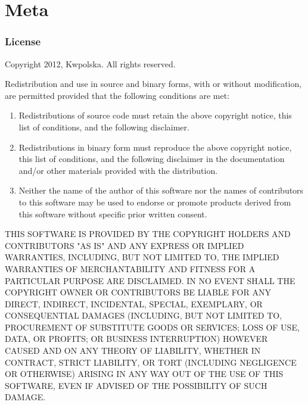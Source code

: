 \documentclass[a4paper,english]{paper}
\providecommand{\\}{\\}
\begin{document}


\part{Meta}
\label{chap:Meta}
\setcounter{section}{0}
\section{License}
Copyright \textcopyright{} 2012, Kwpolska.
All rights reserved.

Redistribution and use in source and binary forms, with or without
modification, are permitted provided that the following conditions are
met:

\begin{enumerate}
    \item Redistributions of source code must retain the above copyright
        notice, this list of conditions, and the following disclaimer.

    \item Redistributions in binary form must reproduce the above copyright
        notice, this list of conditions, and the following disclaimer in the
        documentation and/or other materials provided with the distribution.

    \item Neither the name of the author of this software nor the names of
        contributors to this software may be used to endorse or promote
        products derived from this software without specific prior written
        consent.
\end{enumerate}

THIS SOFTWARE IS PROVIDED BY THE COPYRIGHT HOLDERS AND CONTRIBUTORS
"AS IS" AND ANY EXPRESS OR IMPLIED WARRANTIES, INCLUDING, BUT NOT
LIMITED TO, THE IMPLIED WARRANTIES OF MERCHANTABILITY AND FITNESS FOR
A PARTICULAR PURPOSE ARE DISCLAIMED.  IN NO EVENT SHALL THE COPYRIGHT
OWNER OR CONTRIBUTORS BE LIABLE FOR ANY DIRECT, INDIRECT, INCIDENTAL,
SPECIAL, EXEMPLARY, OR CONSEQUENTIAL DAMAGES (INCLUDING, BUT NOT
LIMITED TO, PROCUREMENT OF SUBSTITUTE GOODS OR SERVICES; LOSS OF USE,
DATA, OR PROFITS; OR BUSINESS INTERRUPTION) HOWEVER CAUSED AND ON ANY
THEORY OF LIABILITY, WHETHER IN CONTRACT, STRICT LIABILITY, OR TORT
(INCLUDING NEGLIGENCE OR OTHERWISE) ARISING IN ANY WAY OUT OF THE USE
OF THIS SOFTWARE, EVEN IF ADVISED OF THE POSSIBILITY OF SUCH DAMAGE.
\pagebreak
\end{document}
